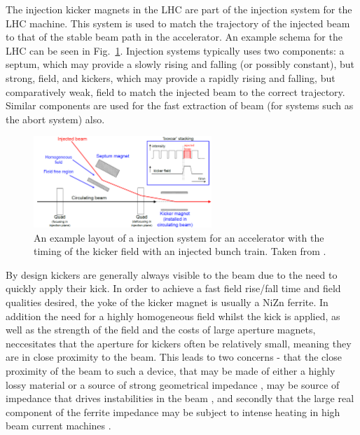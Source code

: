 The injection kicker magnets in the LHC are part of the injection system for the LHC machine. This system is used to match the trajectory of the injected beam to that of the stable beam path in the accelerator. An example schema for the LHC can be seen in Fig.~\ref{fig:injection-system-schema}. Injection systems typically uses two components: a septum, which may provide a slowly rising and falling (or possibly constant), but strong, field, and kickers, which may provide a rapidly rising and falling, but comparatively weak, field to match the injected beam to the correct trajectory. Similar components are used for the fast extraction of beam (for systems such as the abort system) also.

\begin{figure}
\begin{center}
\includegraphics[width=0.6\textwidth]{LHC_MKI/figures/injection-system.png}
\end{center}
\caption{An example layout of a injection system for an accelerator with the timing of the kicker field with an injected bunch train. Taken from \cite{Barnes:injSys}.}
\label{fig:injection-system-schema}
\end{figure}

By design kickers are generally always visible to the beam due to the need to quickly apply their kick. In order to achieve a fast field rise/fall time and field qualities desired, the yoke of the kicker magnet is usually a NiZn ferrite. In addition the need for a highly homogeneous field whilst the kick is applied, as well as the strength of the field and the costs of large aperture magnets, neccesitates that the aperture for kickers often be relatively small, meaning they are in close proximity to the beam. This leads to two concerns - that the close proximity of the beam to such a device, that may be made of either a highly lossy material \cite{Day:wireMeasFerr, Barnes:wireMeasKick, Barnes:spsKickerHeating} or a source of strong geometrical impedance \cite{Belver-Aguilar:clicStripline}, may be source of impedance that drives instabilities in the beam \cite{Salvant:spsImpModel}, and secondly that the large real component of the ferrite impedance may be subject to intense heating in high beam current machines \cite{Barnes:spsKickerHeating}. 

